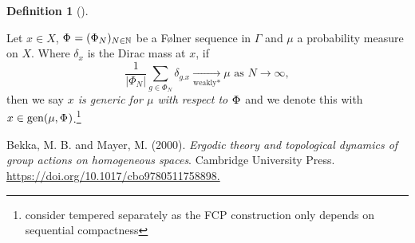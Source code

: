 \documentclass[
  british,
]{article}
\newlength{\cslhangindent}
\newenvironment{CSLReferences}[2] %
 {\begin{list}{}{%
  \setlength{\itemindent}{0pt}
  \setlength{\leftmargin}{0pt}
  \setlength{\parsep}{0pt}
  \ifodd #1
   \setlength{\leftmargin}{\cslhangindent}
   \setlength{\itemindent}{-1\cslhangindent}
  \fi
  \setlength{\itemsep}{#2\baselineskip}}}
 {\end{list}}
\theoremstyle{definition}
\newtheorem{definition}{Definition}[section]
\theoremstyle{remark}
\newcommand{\Folner}[1][\vphantom{}]{{\Phi}_{#1}}
\newcommand{\GroupElement}{{g}}
\newcommand{\Measure}{{\mu}}
\newcommand{\GroupAction}[2]{{#1}.{#2}}
\begin{document}
\begin{definition}[]\protect\hypertarget{def-generic}{}\label{def-generic}

Let \(x\in X\), \(\Folner=(\Folner[N])_{N\in\mathbb{N}}\) be a Følner
sequence in \(\Gamma\) and \(\Measure\) a probability measure on \(X\).
Where \(\delta_x\) is the Dirac mass at \(x\), if
\[\frac{1}{|\Folner[N]|}\sum_{\GroupElement\in\Folner[N]}\delta_{\GroupAction{\GroupElement}{x}}\underset{\text{weakly*}}{\longrightarrow} \Measure \text{ as }N\rightarrow\infty, \]
then we say \emph{\(x\) is generic for \(\Measure\) with respect to
\(\Folner\)} and we denote this with
\(x\in\text{gen}(\Measure,\Folner)\).\footnote{consider tempered
  separately as the FCP construction only depends on sequential
  compactness}

\end{definition}

\label{refs}
\begin{CSLReferences}{1}{0}
Bekka, M. B. and Mayer, M. (2000). \emph{Ergodic theory and topological
dynamics of group actions on homogeneous spaces}. Cambridge University
Press.
\href{https://doi.org/10.1017/cbo9780511758898}{https://doi.org/10.1017/cbo9780511758898.}

\end{CSLReferences}
\end{document}
